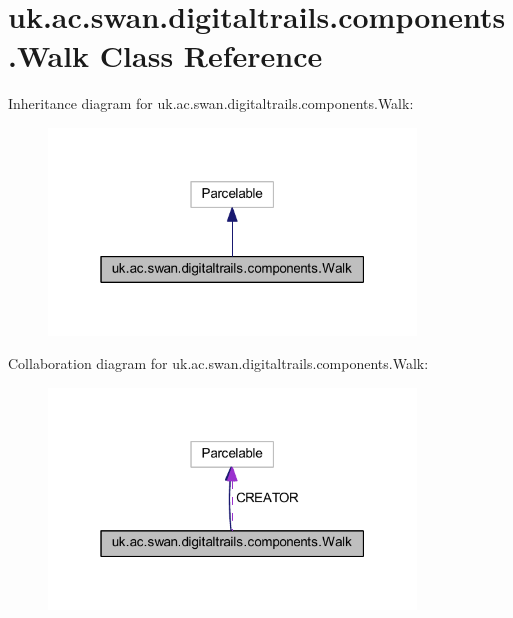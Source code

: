 \hypertarget{classuk_1_1ac_1_1swan_1_1digitaltrails_1_1components_1_1_walk}{\section{uk.\+ac.\+swan.\+digitaltrails.\+components.\+Walk Class Reference}
\label{classuk_1_1ac_1_1swan_1_1digitaltrails_1_1components_1_1_walk}
}


Inheritance diagram for uk.\+ac.\+swan.\+digitaltrails.\+components.\+Walk\+:\nopagebreak
\begin{figure}[H]
\begin{center}
\leavevmode
\includegraphics[width=277pt]{classuk_1_1ac_1_1swan_1_1digitaltrails_1_1components_1_1_walk__inherit__graph}
\end{center}
\end{figure}


Collaboration diagram for uk.\+ac.\+swan.\+digitaltrails.\+components.\+Walk\+:\nopagebreak
\begin{figure}[H]
\begin{center}
\leavevmode
\includegraphics[width=277pt]{classuk_1_1ac_1_1swan_1_1digitaltrails_1_1components_1_1_walk__coll__graph}
\end{center}
\end{figure}
